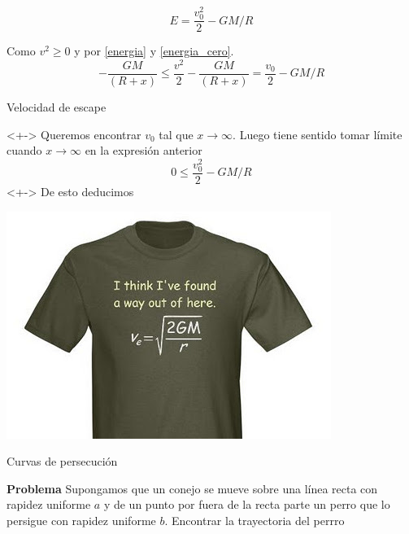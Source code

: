 \documentclass{article}
\begin{document}
\begin{equation}\label{energia_cero}
 E=\frac{v_0^2}{2}-GM/R
\end{equation}

Como $v^2\geq 0$ y por \eqref{energia} y \eqref{energia_cero}.
\[-\frac{GM}{(R+x)}\leq\frac{v^2}{2}-\frac{GM}{(R+x)}=\frac{v_0}{2}-GM/R\]
 



{Velocidad de escape}
 
<+-> Queremos encontrar $v_0$ tal que $x\to\infty$. Luego tiene sentido tomar límite cuando $x\to\infty$ en la expresión anterior 
\[0\leq \frac{v_0^2}{2}-GM/R\]
<+-> De esto deducimos 

\begin{center}
 \includegraphics[scale=.4]{imagenes/velocidad_escape.jpg}
\end{center}




{Curvas de persecución}
 
\textbf{Problema} Supongamos que un conejo se mueve sobre una 
línea recta con rapidez uniforme $a$ y de un punto por fuera de la recta parte un perro que lo 
persigue con rapidez uniforme $b$. Encontrar la trayectoria del perrro
 

 
 
 
\end{document}
